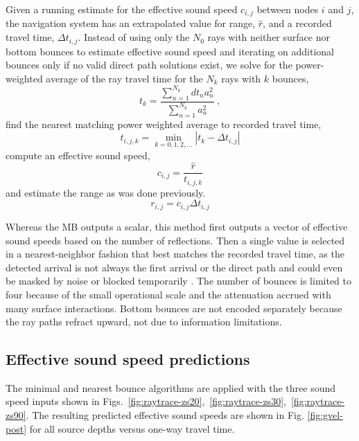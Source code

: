 \documentclass[preprint,TurnOnLineNumbers]{JASA}
\begin{document}
Given a running estimate for the effective sound speed $c_{i,j}$ between nodes $i$ and $j$, the navigation system has an extrapolated value for range, $\hat{r}$, and a recorded travel time, $\Delta t_{i,j}$.
Instead of using only the $N_0$ rays with neither surface nor bottom bounces to estimate effective sound speed and iterating on additional bounces only if no valid direct path solutions exist, we solve for the power-weighted average of the ray travel time for the $N_k$ rays with $k$ bounces,
\begin{equation}
t_k = \frac{\sum_{n=1}^{N_{k}} dt_{n}a_{n}^{2}}{\sum_{n=1}^{N_{k}} a_{n}^{2}} ~, 
\end{equation}
find the nearest matching power weighted average to recorded travel time,
\begin{equation}
t_{i,j,k} = \min_{k=0,1,2,...} \left| t_k - \Delta t_{i,j} \right|
\end{equation}
compute an effective sound speed,
\begin{equation}
c_{i,j} = \dfrac{\hat{r}}{t_{i,j,k}}
\end{equation}
and estimate the range as was done previously.
\begin{equation}
r_{i,j} = c_{i,j}\Delta t_{i,j}
\end{equation}

Whereas the MB outputs a scalar, this method first outputs a vector of effective sound speeds based on the number of reflections.
Then a single value is selected in a nearest-neighbor fashion that best matches the recorded travel time, as the detected arrival is not always the first arrival or the direct path and could even be masked by noise or blocked temporarily \citep{deffenbaugh_acoustic_1996}.
The number of bounces is limited to four because of the small operational scale and the attenuation accrued with many surface interactions.
Bottom bounces are not encoded separately because the ray paths refract upward, not due to information limitations.

\subsection{Effective sound speed predictions}

The minimal and nearest bounce algorithms are applied with the three sound speed inputs shown in Figs.~\ref{fig:raytrace-zs20},~\ref{fig:raytrace-zs30},~\ref{fig:raytrace-zs90}.
The resulting predicted effective sound speeds are shown in Fig. \ref{fig:gvel-post} for all source depths versus one-way travel time.
\end{document}
